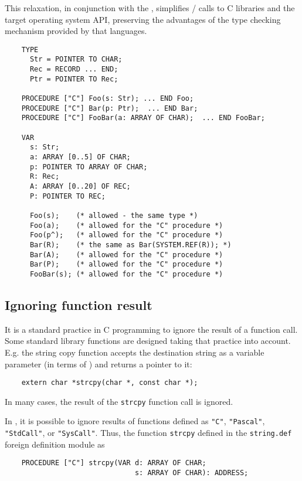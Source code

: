 This relaxation, in conjunction with the
,
simplifies \mt{}/\ot{} calls to C libraries and the target operating
system API, preserving the advantages of the type checking mechanism
provided by that languages.

\Example
\begin{verbatim}
    TYPE
      Str = POINTER TO CHAR;
      Rec = RECORD ... END;
      Ptr = POINTER TO Rec;

    PROCEDURE ["C"] Foo(s: Str); ... END Foo;
    PROCEDURE ["C"] Bar(p: Ptr);  ... END Bar;
    PROCEDURE ["C"] FooBar(a: ARRAY OF CHAR);  ... END FooBar;

    VAR
      s: Str;
      a: ARRAY [0..5] OF CHAR;
      p: POINTER TO ARRAY OF CHAR;
      R: Rec;
      A: ARRAY [0..20] OF REC;
      P: POINTER TO REC;

      Foo(s);    (* allowed - the same type *)
      Foo(a);    (* allowed for the "C" procedure *)
      Foo(p^);   (* allowed for the "C" procedure *)
      Bar(R);    (* the same as Bar(SYSTEM.REF(R)); *)
      Bar(A);    (* allowed for the "C" procedure *)
      Bar(P);    (* allowed for the "C" procedure *)
      FooBar(s); (* allowed for the "C" procedure *)
\end{verbatim}

\subsection{Ignoring function result}

It is a standard practice in C programming to ignore the result of
a function call. Some standard library functions are designed
taking that practice into account. E.g. the string copy
function accepts the destination string as a variable parameter (in
terms of \mt{}) and returns a pointer to it:

\verb'    extern char *strcpy(char *, const char *);'

In many cases, the result of the {\tt strcpy} function call is ignored.

In \xds{}, it is possible to ignore results of functions
defined as \verb'"C"', \verb'"Pascal"', \verb'"StdCall"', or \verb'"SysCall"'.
Thus, the function {\tt strcpy} defined in the \verb'string.def'
foreign definition module as

\verb'    PROCEDURE ["C"] strcpy(VAR d: ARRAY OF CHAR;'\\
\verb'                               s: ARRAY OF CHAR): ADDRESS;'

